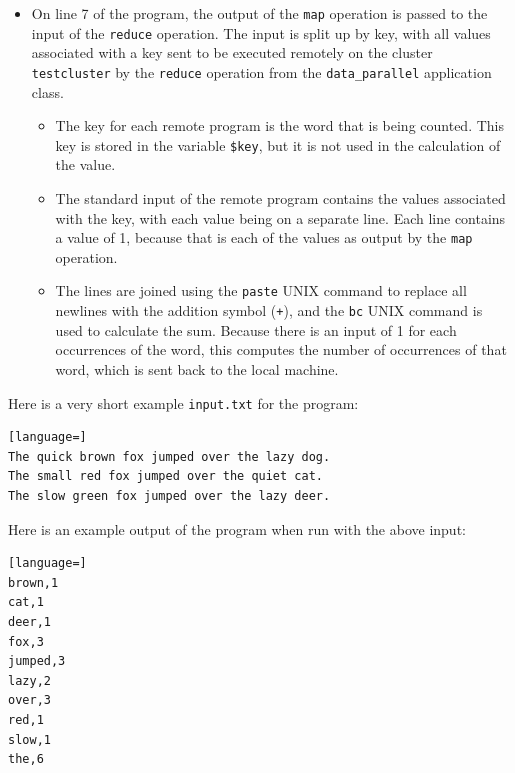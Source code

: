\documentclass[twoside]{report}
\begin{document}
\begin{itemize}
  \item
        On line 7 of the program, the output of the \texttt{map} operation is passed to the input of the \texttt{reduce} operation. The input is split up by key, with all values associated with a key sent to be executed remotely on the cluster \texttt{testcluster} by the \texttt{reduce} operation from the \texttt{data\_parallel} application class.
        \begin{itemize}
          \item The key for each remote program is the word that is being counted. This key is stored in the variable \texttt{\$key}, but it is not used in the calculation of the value.
          \item The standard input of the remote program contains the values associated with the key, with each value being on a separate line. Each line contains a value of 1, because that is each of the values as output by the \texttt{map} operation.
          \item The lines are joined using the \texttt{paste} UNIX command to replace all newlines with the addition symbol (\texttt{+}), and the \texttt{bc} UNIX command is used to calculate the sum.
                Because there is an input of 1 for each occurrences of the word, this computes the number of occurrences of that word, which is sent back to the local machine.
        \end{itemize}
\end{itemize}

Here is a very short example \texttt{input.txt} for the program:

\begin{minipage}[c]{\textwidth-15pt}
  \begin{lstlisting}[language=]
The quick brown fox jumped over the lazy dog.
The small red fox jumped over the quiet cat.
The slow green fox jumped over the lazy deer.
\end{lstlisting}
  \smallskip
\end{minipage}

Here is an example output of the program when run with the above input:

\begin{minipage}[c]{\textwidth-15pt}
  \begin{lstlisting}[language=]
brown,1
cat,1
deer,1
fox,3
jumped,3
lazy,2
over,3
red,1
slow,1
the,6
\end{lstlisting}
  \smallskip
\end{minipage}
\end{document}
